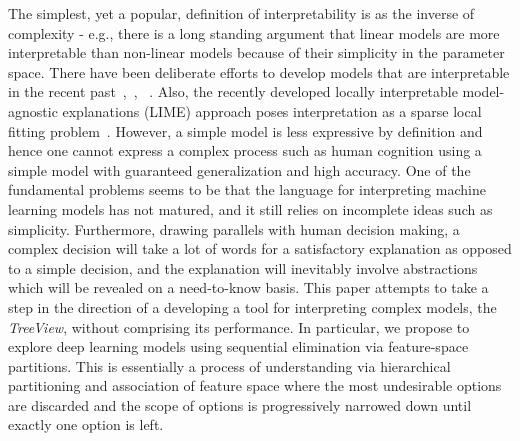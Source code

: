 \documentclass[final]{article}
\begin{document}
The simplest, yet a popular, definition of interpretability is as the inverse of complexity - e.g., there is a long standing argument that linear models are more interpretable than non-linear models because of their simplicity in the parameter space. There have been deliberate efforts to develop models
that are interpretable in the recent past~\cite{rivest1987learning},~\cite{malioutov2013exact},~\cite{ustun2014methods} .  Also, the recently developed
locally interpretable model-agnostic explanations (LIME) approach poses interpretation as a sparse local fitting problem~\cite{ribeiro2016model}. However, a simple model is less expressive by definition and hence one cannot express a complex process such as human cognition using a simple model with guaranteed generalization and high accuracy. One of the fundamental problems seems to be that the language for interpreting machine learning models has not matured, and it still relies on incomplete ideas such as simplicity. Furthermore, drawing parallels with human decision making, a complex decision will take a lot of words for a satisfactory explanation as opposed to a simple decision, and the explanation will inevitably involve abstractions which will be revealed on a need-to-know basis. This paper attempts to take a step in the direction of a developing a tool for interpreting complex models, the \emph{TreeView}, without comprising its performance. In particular, we propose to explore deep learning models using sequential elimination via feature-space partitions. This is essentially a process of understanding via hierarchical partitioning and association of feature space where the most undesirable options are discarded and the scope of options is progressively narrowed down until exactly one option is left.






\end{document}
